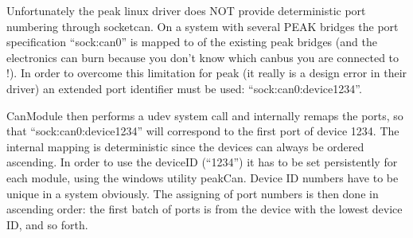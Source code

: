 \documentclass[a4paper,10pt,english]{sphinxmanual}
\begin{document}
\sphinxAtStartPar
Unfortunately the peak linux driver does NOT provide deterministic port numbering through socketcan. On a
system with several PEAK bridges the port specification “sock:can0” is mapped to 
of the existing peak bridges (and the electronics can burn because you don’t know which
can\sphinxhyphen{}bus you are connected to !). In order to overcome this limitation for peak
(it really is a design error in their driver) an extended port identifier must be used: “sock:can0:device1234”.

\sphinxAtStartPar
CanModule then performs a udev system call and internally remaps the ports, so that “sock:can0:device1234”
will correspond to the first port of device 1234. The internal mapping is deterministic since the devices
can always be ordered ascending.
In order to use the deviceID (“1234”) it has to be set persistently for each module, using the windows
utility peakCan. Device ID numbers have to be unique in a system obviously. The assigning of port numbers
is then done in ascending order: the first batch of ports is from the device with the lowest device ID,
and so forth.
\end{document}
